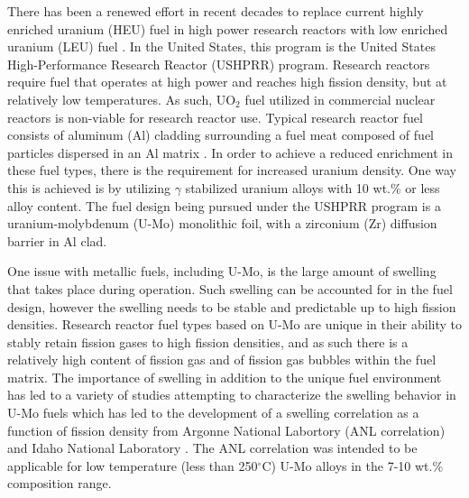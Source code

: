 \documentclass[review]{elsarticle}
\begin{document}
There has been a renewed effort in recent decades to replace current highly enriched uranium (HEU) fuel in high power research reactors with low enriched uranium (LEU) fuel \cite{snelgrove1997}. In the United States, this program is the United States High-Performance Research Reactor (USHPRR) program. Research reactors require fuel that operates at high power and reaches high fission density, but at relatively low temperatures. As such, UO$_{2}$ fuel utilized in commercial nuclear reactors is non-viable for research reactor use. Typical research reactor fuel consists of aluminum (Al) cladding surrounding a fuel meat composed of fuel particles dispersed in an Al matrix \cite{meyer2014}. In order to achieve a reduced enrichment in these fuel types, there is the requirement for increased uranium density. One way this is achieved is by utilizing $\gamma$ stabilized uranium alloys with 10 wt.\% or less alloy content. The fuel design being pursued under the USHPRR program is a uranium-molybdenum (U-Mo) monolithic foil, with a zirconium (Zr) diffusion barrier in Al clad.

One issue with metallic fuels, including U-Mo, is the large amount of swelling that takes place during operation\cite{hofman1997}. Such swelling can be accounted for in the fuel design, however the swelling needs to be stable and predictable up to high fission densities. Research reactor fuel types based on U-Mo are unique in their ability to stably retain fission gases to high fission densities, and as such there is a relatively high content of fission gas and of fission gas bubbles within the fuel matrix. The importance of swelling in addition to the unique fuel environment has led to a variety of studies attempting to characterize the swelling behavior in U-Mo fuels \cite{rest2009, kim_anl08, meyer2002, kim2013} which has led to the development of a swelling correlation as a function of fission density from Argonne National Labortory (ANL correlation) \cite{kim2011} and Idaho National Laboratory \cite{umo_prelim_report2017}. The ANL correlation was intended to be applicable for low temperature (less than 250$^{\circ}$C) U-Mo alloys in the 7-10 wt.\% composition range. 
\end{document}
